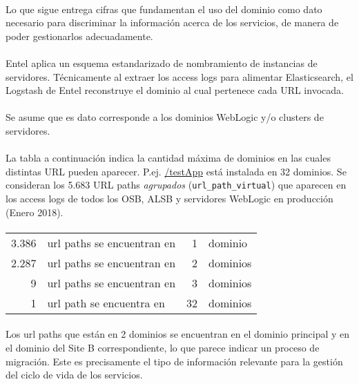 \paragraph{}
Lo que sigue entrega cifras que fundamentan el uso del dominio como dato necesario
para discriminar la informaci\'on acerca de los servicios,
de manera de poder gestionarlos adecuadamente.

\paragraph{}
Entel aplica un esquema estandarizado de nombramiento de instancias de servidores.
%
T\'ecnicamente al extraer los access logs para alimentar Elasticsearch, 
el Logstash de Entel reconstruye el dominio al cual pertenece cada URL invocada.

\paragraph{}
Se asume que es dato corresponde a los dominios WebLogic y/o clusters de servidores.

\paragraph{}
La tabla a continuaci\'on indica la cantidad m\'axima de dominios en las cuales
distintas URL pueden aparecer. P.ej. \url{/testApp} est\'a instalada en 32 dominios.
%
Se consideran los 5.683 URL paths \emph{agrupados} (\verb|url_path_virtual|)
que aparecen en los access logs
de todos los OSB, ALSB y servidores WebLogic en producci\'on (Enero 2018).

\paragraph{}
\begin{tabular}{rlrl}
    3.386 & url paths se encuentran en & 1 & dominio\\ 
    2.287 & url paths se encuentran en & 2 & dominios\\ 
        9 & url paths se encuentran en & 3 & dominios\\ 
        1 & url path se encuentra en   & 32 & dominios\\
\end{tabular}

\paragraph{}
Los url paths que est\'an en 2 dominios se encuentran en el dominio principal y
en el dominio del Site B correspondiente, lo que parece indicar un proceso de migraci\'on.
%
Este es precisamente el tipo de informaci\'on relevante para la gesti\'on del ciclo
de vida de los servicios.


